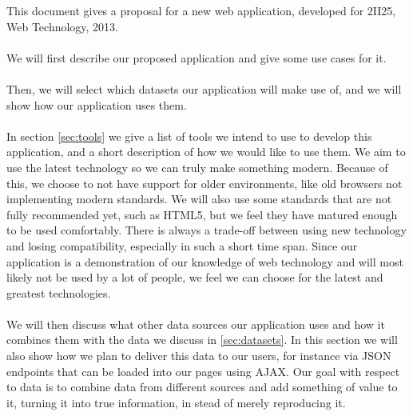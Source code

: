 This document gives a proposal for a new web application, developed for 2II25, Web Technology, 2013.

\paragraph{}
We will first describe our proposed application and give some use cases for it.

\paragraph{}
Then, we will select which datasets our application will make use of, and we will show how our application uses them.

\paragraph{}
In section \ref{sec:tools} we give a list of tools we intend to use to develop this application, and a short description of how we would like to use them.
We aim to use the latest technology so we can truly make something modern.
Because of this, we choose to not have support for older environments, like old browsers not implementing modern standards.
We will also use some standards that are not fully recommended yet, such as HTML5, but we feel they have matured enough to be used comfortably.
There is always a trade-off between using new technology and losing compatibility, especially in such a short time span.
Since our application is a demonstration of our knowledge of web technology and will most likely not be used by a lot of people, we feel we can choose for the latest and greatest technologies.

\paragraph{}
We will then discuss what other data sources our application uses and how it combines them with the data we discuss in \ref{sec:datasets}.
In this section we will also show how we plan to deliver this data to our users, for instance via JSON endpoints that can be loaded into our pages using AJAX.
Our goal with respect to data is to combine data from different sources and add something of value to it, turning it into true information, in stead of merely reproducing it.
